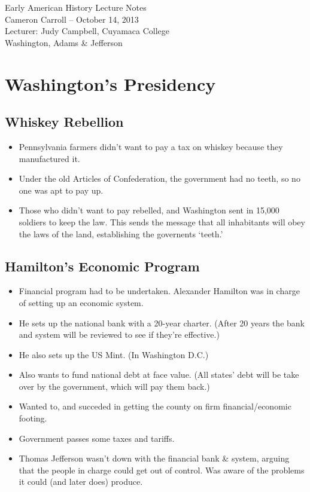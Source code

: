 \documentclass{article}
\begin{document}
  \begin{center}
    {\small{} Early American History Lecture Notes} \\[0.6cm]
    {\small{} Cameron Carroll -- October 14, 2013} \\[0.6cm]
    {\small{} Lecturer: Judy Campbell, Cuyamaca College}\\[1cm]
    {\small{} Washington, Adams \& Jefferson}\\[1cm]
  \end{center}
  
  \tableofcontents
  \newpage
  
  \section{Washington's Presidency}
    \subsection{Whiskey Rebellion}
      \begin{itemize}
        \item Pennsylvania farmers didn't want to pay a tax on whiskey because they manufactured it.
        \item Under the old Articles of Confederation, the government had no teeth, so no one was apt to pay up.
        \item Those who didn't want to pay rebelled, and Washington sent in 15,000 soldiers to keep the law. This sends the message that all inhabitants will obey the laws of the land, establishing the governents `teeth.'
      \end{itemize}
    \subsection{Hamilton's Economic Program}
      \begin{itemize}
        \item Financial program had to be undertaken. Alexander Hamilton was in charge of setting up an economic system.
        \item He sets up the national bank with a 20-year charter. (After 20 years the bank and system will be reviewed to see if they're effective.)
        \item He also sets up the US Mint. (In Washington D.C.)
        \item Also wants to fund national debt at face value. (All states' debt will be take over by the government, which will pay them back.)
        \item Wanted to, and succeded in getting the county on firm financial/economic footing.
        \item Government passes some taxes and tariffs.
        \item Thomas Jefferson wasn't down with the financial bank \& system, arguing that the people in charge could get out of control. Was aware of the problems it could (and later does) produce. 
      \end{itemize}
\end{document}
